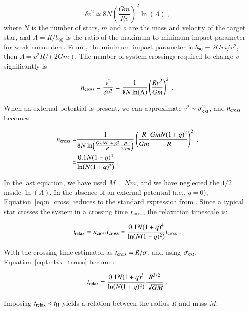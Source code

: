 \begin{appendixs}
	\begin{equation}
		\delta v^2 \simeq 8N \left(\frac{Gm}{Rv}\right)^2 \ln(\Lambda)~,
	\end{equation}
	where $N$ is the number of stars, $m$ and $v$ are the mass and velocity of the target star, and $\Lambda = R/b_{90}$ is the ratio of the maximum to minimum impact parameter for weak encounters. From \citet{2008gady.book.....B}, the minimum impact parameter is $b_{90} = 2Gm/v^2$, then $\Lambda = v^2 R/(2Gm)$. The number of system crossings required to change $v$ significantly is
	
	\begin{equation}
		n_{\rm cross} = \frac{v^2}{\delta v^2} = \frac{1}{8N\ln(\Lambda)}\left(\frac{Rv^2}{Gm}\right)^2~.
	\end{equation}
	
	When an external potential is present, we can approximate $v^2 \sim \sigma_{\rm ext}^2$, and $n_{\rm cross}$ becomes
	
	\begin{align}
		n_{\rm cross} =& \frac{1}{8N\ln(\frac{GmN(1+q)^2}{R} \frac{R}{2Gm})}\left(\frac{R}{Gm} \frac{GmN(1+q)^2}{R}\right)^2 ~,\\
		\simeq& \frac{0.1 N(1+q)^4}{\ln(N(1+q)^2)}~.
		\label{eq:n_cross}
	\end{align}
	
	In the last equation, we have used $M = Nm$, and we have neglected the $1/2$ inside $\ln(\Lambda)$. In the absence of an external potential (i.e., $q=0$), Equation~\eqref{eq:n_cross} reduces to the standard expression from \citet{2008gady.book.....B}. Since a typical star crosses the system in a crossing time $t_{\rm cross}$, the relaxation timescale is:
	
	\begin{equation}
		t_{\rm relax} = n_{\rm cross} t_{\rm cross} = \frac{0.1 N(1+q)^4}{\ln(N(1+q)^2)} t_{\rm cross}~.
		\label{eq:trelax_tcross}
	\end{equation}
	
	With the crossing time estimated as $t_{\rm cross} = R/\sigma$, and using $\sigma_{\rm ext}$, Equation~\eqref{eq:trelax_tcross} becomes
	
	\begin{equation}
		t_{\rm relax} = \frac{0.1 N(1+q)^3}{\ln(N(1+q)^2)} \frac{R^{3/2}}{\sqrt{GM}}~.
		\label{eq:trelax_ext}
	\end{equation}
	
	Imposing $t_{\rm relax} < t_{\rm H}$ yields a relation between the radius $R$ and mass $M$:
	

\end{appendixs}

